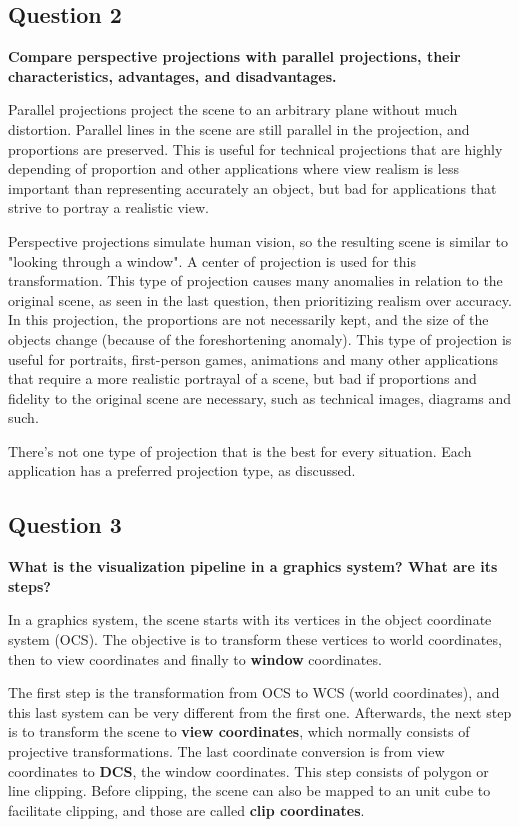 \documentclass[12pt]{article}
\begin{document}
\subsection*{Question 2}
{\bfseries Compare perspective projections with parallel projections, their characteristics, advantages, and disadvantages.}

Parallel projections project the scene to an arbitrary plane without much distortion. Parallel lines in the scene are still parallel in the projection, and proportions are preserved. This is useful for technical projections that are highly depending of proportion and other applications where view realism is less important than representing accurately an object, but bad for applications that strive to portray a realistic view.

Perspective projections simulate human vision, so the resulting scene is similar to "looking through a window". A center of projection is used for this transformation. This type of projection causes many anomalies in relation to the original scene, as seen in the last question, then prioritizing realism over accuracy. In this projection, the proportions are not necessarily kept, and the size of the objects change (because of the foreshortening anomaly). This type of projection is useful for portraits, first-person games, animations and many other applications that require a more realistic portrayal of a scene, but bad if proportions and fidelity to the original scene are necessary, such as technical images, diagrams and such.

There's not one type of projection that is the best for every situation. Each application has a preferred projection type, as discussed.

\subsection*{Question 3}
{\bfseries What is the visualization pipeline in a graphics system? What are its steps?}

In a graphics system, the scene starts with its vertices in the object coordinate system (OCS). The objective is to transform these vertices to world coordinates, then to view coordinates and finally to \textbf{window} coordinates.

The first step is the transformation from OCS to WCS (world coordinates), and this last system can be very different from the first one. Afterwards, the next step is to transform the scene to \textbf{view coordinates}, which normally consists of projective transformations. The last coordinate conversion is from view coordinates to \textbf{DCS}, the window coordinates. This step consists of polygon or line clipping. Before clipping, the scene can also be mapped to an unit cube to facilitate clipping, and those are called \textbf{clip coordinates}.
\end{document}
